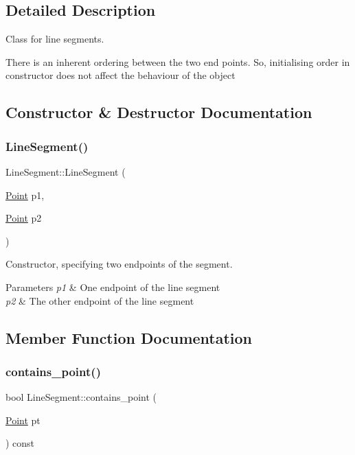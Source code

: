 \subsection{Detailed Description}
Class for line segments. 

There is an inherent ordering between the two end points. So, initialising order in constructor does not affect the behaviour of the object 

\subsection{Constructor \& Destructor Documentation}
\mbox{\label{classLineSegment_a691e185edf3aa7e2dc12307f9ef4be6b}} 
\subsubsection{\texorpdfstring{Line\+Segment()}{LineSegment()}}
{\footnotesize\ttfamily Line\+Segment\+::\+Line\+Segment (\begin{DoxyParamCaption}\item[{\hyperlink{classPoint}{Point}}]{p1,  }\item[{\hyperlink{classPoint}{Point}}]{p2 }\end{DoxyParamCaption})}



Constructor, specifying two endpoints of the segment. 


\begin{DoxyParams}{Parameters}
{\em p1} & One endpoint of the line segment \\
\hline
{\em p2} & The other endpoint of the line segment \\
\hline
\end{DoxyParams}


\subsection{Member Function Documentation}
\mbox{\label{classLineSegment_a8dc46fa1dd259befff8cea92232e2a29}} 
\subsubsection{\texorpdfstring{contains\+\_\+point()}{contains\_point()}}
{\footnotesize\ttfamily bool Line\+Segment\+::contains\+\_\+point (\begin{DoxyParamCaption}\item[{\hyperlink{classPoint}{Point}}]{pt }\end{DoxyParamCaption}) const}

